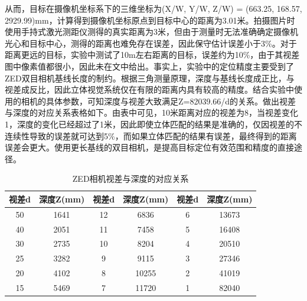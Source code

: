 从而，目标在摄像机坐标系下的三维坐标为(X/W, Y/W, Z/W) = (663.25, 168.57, 2929.99)mm，计算得到摄像机坐标原点到目标中心的距离为3.01米。拍摄图片时使用手持式激光测距仪测得的真实距离为3米，但由于测量时无法准确确定摄像机光心和目标中心，测得的距离也难免存在误差，因此保守估计误差小于3\%。对于距离更远的目标，实验中测试了10m左右距离的目标，误差约为10\%，由于其视差图中像素值都很小，因此未在文中给出。事实上，实验中的定位精度主要受到了ZED双目相机基线长度的制约。根据三角测量原理，深度与基线长度成正比，与视差成反比，因此立体视觉系统仅在有限的距离内具有较高的精度。结合实验中使用的相机的具体参数，可知深度与视差大致满足Z=82039.66/d的关系。做出视差与深度的对应关系表格如下。由表中可见，10米距离对应的视差为8，当视差变化1，深度的变化已经超过了1米，因此即使立体匹配的结果是准确的，仅因视差的不连续性导致的误差就可达到5\%，而如果立体匹配的结果有误差，最终得到的距离误差会更大。使用更长基线的双目相机，是提高目标定位有效范围和精度的直接途径。

\begin{table}[htb] %
	\centering
	\caption{ZED相机视差与深度的对应关系}
	\label{tab:5_ZED相机视差与深度的对应关系}
	\begin{small}
		\begin{tabular*}{\textwidth}{@{\extracolsep{\fill}}cccccc} \toprule[2pt]
			视差d & 深度Z(mm) & 视差d & 深度Z(mm) & 视差d & 深度Z(mm) \\ \midrule[1pt]
			50      & 1641          & 12      & 6836         & 6        & 13673 \\
			40      & 2051         & 11       & 7458         & 5        & 16408 \\
			30      & 2735         & 10       & 8204        & 4        & 20510 \\
			25      & 3282         & 9        & 9115         & 3        & 27346 \\
			20      & 4102         & 8        & 10255       & 2        & 41019 \\
			15      & 5469         & 7        & 11720        & 1         & 82040 \\
			\bottomrule[2pt]
		\end{tabular*}
	\end{small}
\end{table}



